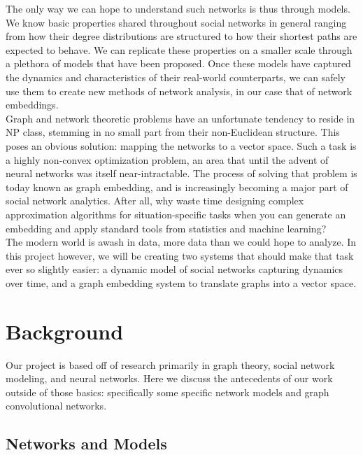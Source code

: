 \documentclass[12pt,twoside]{report}
\begin{document}
The only way we can hope to understand such networks is thus through models. We know basic properties shared throughout social networks in general ranging from how their degree distributions are structured to how their shortest paths are expected to behave. We can replicate these properties on a smaller scale through a plethora of models that have been proposed. Once these models have captured the dynamics and characteristics of their real-world counterparts, we can safely use them to create new methods of network analysis, in our case that of network embeddings. \\

Graph and network theoretic problems have an unfortunate tendency to reside in NP class, stemming in no small part from their non-Euclidean structure. This poses an obvious solution: mapping the networks to a vector space. Such a task is a highly non-convex optimization problem, an area that until the advent of neural networks was itself near-intractable. The process of solving that problem is today known as graph embedding, and is increasingly becoming a major part of social network analytics. After all, why waste time designing complex approximation algorithms for situation-specific tasks when you can generate an embedding and apply standard tools from statistics and machine learning? \\

The modern world is awash in data, more data than we could hope to analyze. In this project however, we will be creating two systems that should make that task ever so slightly easier: a dynamic model of social networks capturing dynamics over time, and a graph embedding system to translate graphs into a vector space. \\

\chapter{Background}

Our project is based off of research primarily in graph theory, social network modeling, and neural networks. Here we discuss the antecedents of our work outside of those basics: specifically some specific network models and graph convolutional networks. \\

\section{Networks and Models} 
\end{document}
